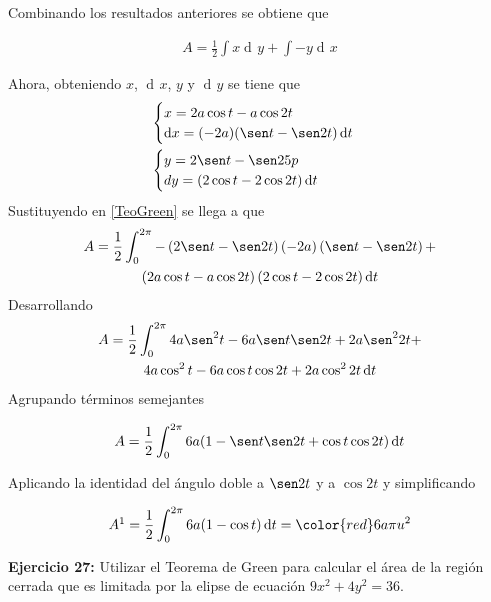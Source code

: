 \documentclass[12pt]{article}
\DeclareMathOperator{\di}{d\!}
\begin{document}
Combinando los resultados anteriores se obtiene que 

\begin{align} \label{TeoGreen}
	A = \frac{1}{2}  \int x \di y + \int -y \di x
\end{align}

Ahora, obteniendo $x$, $\di x$, $y$ y $\di y$ se tiene que 
\begin{align*}
	&\begin{cases}
		x = 2a \cos t - a \cos 2t \\
		\di x = (-2a)(\sen t - \sen 2t) \di t
	\end{cases} \\
	&\begin{cases}
		y = 2 \sen t - \sen 25p \\
		dy = (2\cos t - 2\cos 2t)\di t
	\end{cases}
\end{align*}
Sustituyendo en \ref{TeoGreen} se llega a que 
\begin{multline*}
	A = \frac{1}{2} \int_0^{2\pi} -\left(2 \sen t - \sen 2t \right)\left(-2a
	\right)\left(\sen t - \sen 2t\right)
	+\\ \left(2a \cos t - a\cos 2t \right)\left(2 \cos t - 2 \cos 2t\right) \di t	
\end{multline*}
Desarrollando
\begin{multline*}
	A = \frac{1}{2} \int_0^{2\pi} 4a \sen^2 t - 6a \sen t \sen 2t + 2a \sen^2 2t +\\
	4a \cos^2 t - 6a \cos t \cos 2t + 2a \cos^2 2t \di t
\end{multline*}
Agrupando términos semejantes

\begin{align*}
	A = \frac{1}{2} \int_0^{2\pi} 6a (1-  \sen t\sen 2t + \cos t \cos 2t) \di t
\end{align*}

Aplicando la identidad del ángulo doble a $\sen 2t$ y a $\cos 2t$ y simplificando

\begin{align*}
	 A \footnotemark = \frac{1}{2} \int_0^{2\pi} 6a(1-\cos t) \di t = \color{red} 6a\pi u^2 
\end{align*} 



\noindent \textbf{Ejercicio 27:} Utilizar el Teorema de Green para calcular el área de la región cerrada que es limitada por la elipse de ecuación $9x^2 + 4y^2 = 36$.
\end{document}
